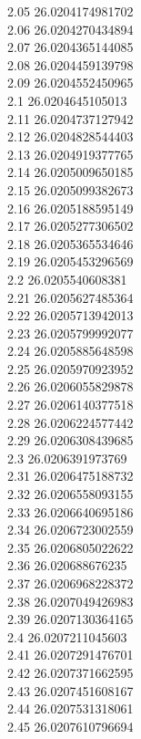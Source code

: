 {2.05	26.0204174981702\\
2.06	26.0204270434894\\
2.07	26.0204365144085\\
2.08	26.0204459139798\\
2.09	26.0204552450965\\
2.1	26.0204645105013\\
2.11	26.0204737127942\\
2.12	26.0204828544403\\
2.13	26.0204919377765\\
2.14	26.0205009650185\\
2.15	26.0205099382673\\
2.16	26.0205188595149\\
2.17	26.0205277306502\\
2.18	26.0205365534646\\
2.19	26.0205453296569\\
2.2	26.0205540608381\\
2.21	26.0205627485364\\
2.22	26.0205713942013\\
2.23	26.0205799992077\\
2.24	26.0205885648598\\
2.25	26.0205970923952\\
2.26	26.0206055829878\\
2.27	26.0206140377518\\
2.28	26.0206224577442\\
2.29	26.0206308439685\\
2.3	26.0206391973769\\
2.31	26.0206475188732\\
2.32	26.0206558093155\\
2.33	26.0206640695186\\
2.34	26.0206723002559\\
2.35	26.0206805022622\\
2.36	26.020688676235\\
2.37	26.0206968228372\\
2.38	26.0207049426983\\
2.39	26.0207130364165\\
2.4	26.0207211045603\\
2.41	26.0207291476701\\
2.42	26.0207371662595\\
2.43	26.0207451608167\\
2.44	26.0207531318061\\
2.45	26.0207610796694\\
}
